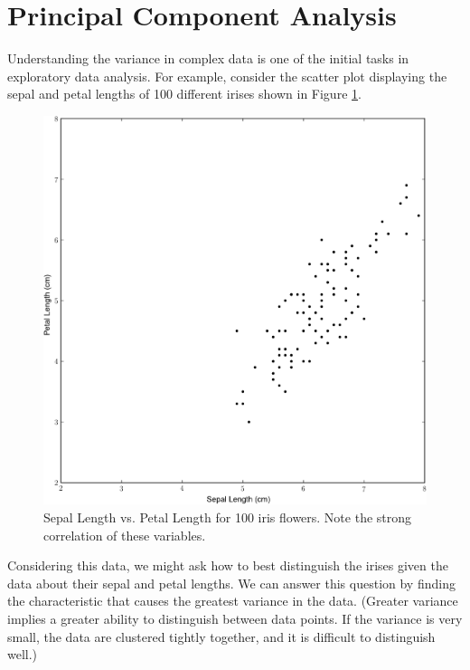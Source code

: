 
\section*{Principal Component Analysis}
Understanding the variance in complex data is one of the initial tasks in exploratory data analysis. For example, consider the scatter plot  displaying the sepal and petal lengths of 100 different irises shown in Figure \ref{fig:iris_1}.
\begin{figure}
\includegraphics[width=\textwidth]{iris0.pdf}
\caption{Sepal Length vs. Petal Length for 100 iris flowers. Note the strong correlation of these variables.}
\label{fig:iris_1}
\end{figure}
Considering this data, we might ask how to best distinguish the irises given the data about their sepal and petal lengths.
We can answer this question by finding the characteristic that causes the greatest variance in the data. 
(Greater variance implies a greater ability to distinguish between data points. If the variance is very small, the data are clustered tightly together, and it is difficult to distinguish well.)

